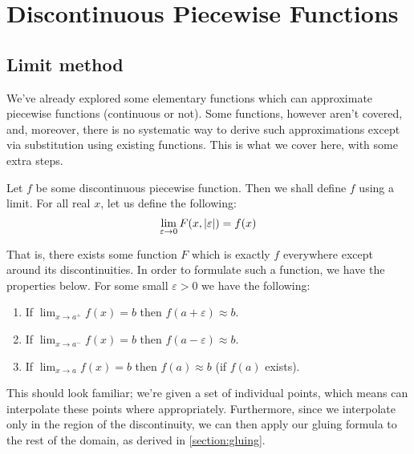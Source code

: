 \chapter{Discontinuous Piecewise Functions}
\section{Limit method}
We've already explored some elementary functions which can approximate piecewise functions (continuous or not). Some functions, however aren't covered, and, moreover, there is no systematic way to derive such approximations except via substitution using existing functions. This is what we cover here, with some extra steps.

Let $f$ be some discontinuous piecewise function. Then we shall define $f$ using a limit. For all real $x$, let us define the following:
$$
    \lim_{\varepsilon\to0}{F(x,\abs{\varepsilon})}=f(x)
$$

That is, there exists some function $F$ which is exactly $f$ everywhere except around its discontinuities. In order to formulate such a function, we have the properties below. For some small $\varepsilon>0$ we have the following:

\begin{enumerate}
    \item If $\lim_{x\to a^+}{f(x)}=b$ then $f(a+\varepsilon)\approx b$.
    \item If $\lim_{x\to a^-}{f(x)}=b$ then $f(a-\varepsilon)\approx b$.
    \item If $\lim_{x\to a}{f(x)}=b$ then $f(a)\approx b$ (if $f(a)$ exists).
\end{enumerate}

This should look familiar; we're given a set of individual points, which means can interpolate these points where appropriately. Furthermore, since we interpolate only in the region of the discontinuity, we can then apply our gluing formula to the rest of the domain, as derived in \autoref{section:gluing}.

